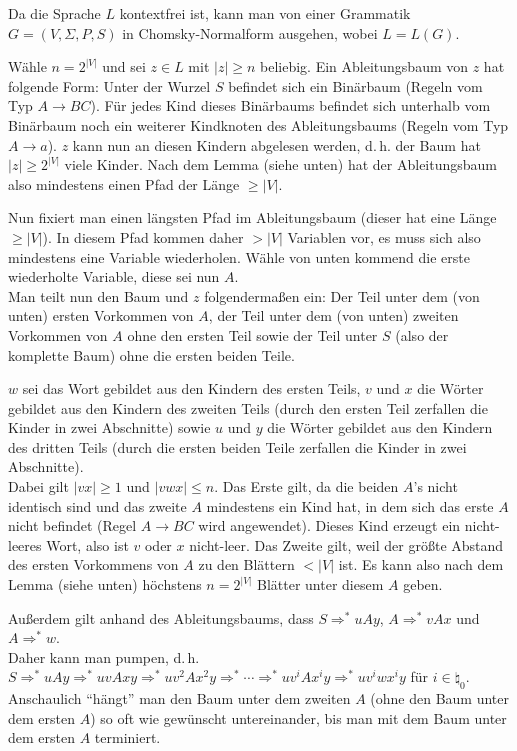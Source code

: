 \begin{Beweis}
    Da die Sprache $L$ kontextfrei ist, kann man von einer Grammatik
    $G = (V, \Sigma, P, S)$ in Chomsky-Normalform ausgehen, wobei $L = L(G)$.
    
    Wähle $n = 2^{|V|}$ und sei $z \in L$ mit $|z| \ge n$ beliebig.
    Ein Ableitungsbaum von $z$ hat folgende Form:
    Unter der Wurzel $S$ befindet sich ein Binärbaum
    (Regeln vom Typ $A \rightarrow BC$).
    Für jedes Kind dieses Binärbaums befindet sich unterhalb vom Binärbaum
    noch ein weiterer Kindknoten des Ableitungsbaums
    (Regeln vom Typ $A \rightarrow a$).
    $z$ kann nun an diesen Kindern abgelesen werden, d.\,h.
    der Baum hat $|z| \ge 2^{|V|}$ viele Kinder.
    Nach dem Lemma (siehe unten) hat der Ableitungsbaum also mindestens einen
    Pfad der Länge $\ge |V|$.
    
    Nun fixiert man einen längsten Pfad im Ableitungsbaum
    (dieser hat eine Länge $\ge |V|$).
    In diesem Pfad kommen daher $> |V|$ Variablen vor,
    es muss sich also mindestens eine Variable wiederholen.
    Wähle von unten kommend die erste wiederholte Variable,
    diese sei nun $A$.\\
    Man teilt nun den Baum und $z$ folgendermaßen ein:
    Der Teil unter dem (von unten) ersten Vorkommen von $A$,
    der Teil unter dem (von unten) zweiten Vorkommen von $A$
    ohne den ersten Teil
    sowie der Teil unter $S$ (also der komplette Baum) ohne
    die ersten beiden Teile.
    
    $w$ sei das Wort gebildet aus den Kindern des ersten Teils,
    $v$ und $x$ die Wörter gebildet aus den Kindern des zweiten Teils
    (durch den ersten Teil zerfallen die Kinder in zwei Abschnitte) sowie
    $u$ und $y$ die Wörter gebildet aus den Kindern des dritten Teils
    (durch die ersten beiden Teile zerfallen die Kinder in zwei Abschnitte).\\
    Dabei gilt $|vx| \ge 1$ und $|vwx| \le n$.
    Das Erste gilt, da die beiden $A$'s nicht identisch sind und
    das zweite $A$ mindestens ein Kind hat, in dem sich das erste $A$ nicht
    befindet (Regel $A \rightarrow BC$ wird angewendet).
    Dieses Kind erzeugt ein nicht-leeres Wort, also ist $v$ oder $x$
    nicht-leer.
    Das Zweite gilt, weil der größte Abstand des ersten Vorkommens von $A$ zu
    den Blättern $< |V|$ ist.
    Es kann also nach dem Lemma (siehe unten) höchstens
    $n = 2^{|V|}$ Blätter unter diesem $A$ geben.
    
    Außerdem gilt anhand des Ableitungsbaums, dass
    $S \Rightarrow^\ast uAy$,
    $A \Rightarrow^\ast vAx$ und
    $A \Rightarrow^\ast w$.\\
    Daher kann man pumpen, d.\,h.
    $S \Rightarrow^\ast uAy \Rightarrow^\ast uvAxy \Rightarrow^\ast uv^2Ax^2y
    \Rightarrow^\ast \dotsb \Rightarrow^\ast uv^iAx^iy \Rightarrow^\ast
    uv^iwx^iy$ für $i \in \natural_0$.
    Anschaulich "`hängt"' man den Baum unter dem zweiten $A$
    (ohne den Baum unter dem ersten $A$) so oft wie gewünscht untereinander,
    bis man mit dem Baum unter dem ersten $A$ terminiert.
\end{Beweis}

